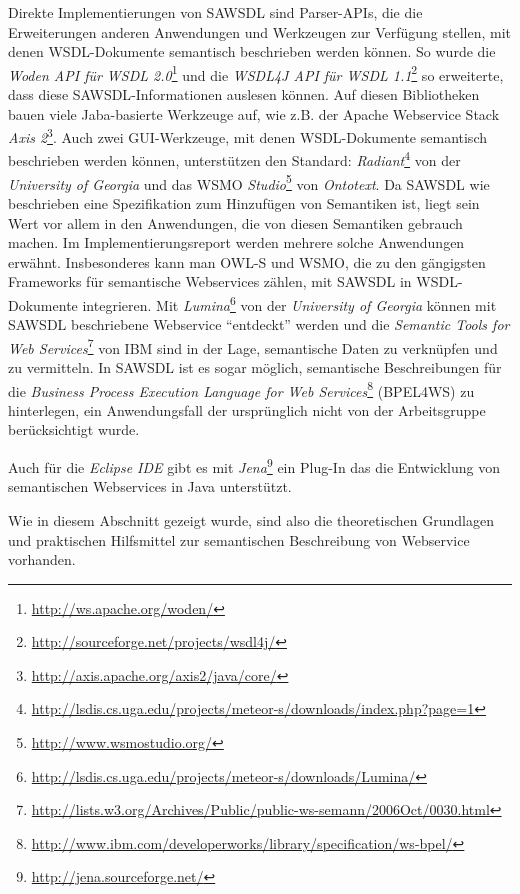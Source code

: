 Direkte Implementierungen von \ac{SAWSDL} sind Parser-\ac{API}s, die die Erweiterungen anderen Anwendungen und Werkzeugen zur Verfügung stellen, mit denen \ac{WSDL}-Dokumente semantisch beschrieben werden können. So wurde die \emph{Woden API für WSDL 2.0}\footnote{\url{http://ws.apache.org/woden/}} und die \emph{WSDL4J API für WSDL
1.1}\footnote{\url{http://sourceforge.net/projects/wsdl4j/}} so erweiterte, dass diese \ac{SAWSDL}-Informationen auslesen können. Auf diesen Bibliotheken bauen viele Jaba-basierte Werkzeuge auf, wie z.B. der Apache Webservice Stack \emph{Axis 2}\footnote{\url{http://axis.apache.org/axis2/java/core/}}. Auch zwei GUI-Werkzeuge, mit denen \ac{WSDL}-Dokumente semantisch beschrieben werden können, unterstützen den Standard: \emph{Radiant}\footnote{\url{http://lsdis.cs.uga.edu/projects/meteor-s/downloads/index.php?page=1}} von der \emph{University of Georgia} und das \acl{WSMO} \emph{Studio}\footnote{\url{http://www.wsmostudio.org/}} von \emph{Ontotext}. Da \ac{SAWSDL} wie beschrieben eine Spezifikation zum Hinzufügen von Semantiken ist, liegt sein Wert vor allem in den Anwendungen, die von diesen Semantiken gebrauch machen. Im Implementierungsreport werden mehrere solche Anwendungen erwähnt.
Insbesonderes kann man \ac{OWL-S} und \ac{WSMO}, die zu den gängigsten Frameworks für semantische Webservices zählen,  mit \ac{SAWSDL} in \ac{WSDL}-Dokumente integrieren. Mit \emph{Lumina}\footnote{\url{http://lsdis.cs.uga.edu/projects/meteor-s/downloads/Lumina/}} von der \emph{University of Georgia} können mit \ac{SAWSDL} beschriebene Webservice "`entdeckt"' werden und die \emph{Semantic Tools for Web Services}\footnote{\url{http://lists.w3.org/Archives/Public/public-ws-semann/2006Oct/0030.html}} von IBM sind in der Lage, semantische Daten zu verknüpfen und zu vermitteln.
In \ac{SAWSDL} ist es sogar möglich, semantische Beschreibungen für die \emph{Business Process Execution Language for Web Services}\footnote{\url{http://www.ibm.com/developerworks/library/specification/ws-bpel/}} (BPEL4WS) zu hinterlegen, ein Anwendungsfall der ursprünglich nicht von der Arbeitsgruppe berücksichtigt wurde. \cite[S.63]{ky-sawsdl}

Auch für die \emph{Eclipse IDE} gibt es mit \emph{Jena}\footnote{\url{http://jena.sourceforge.net/}} ein Plug-In das die Entwicklung von semantischen Webservices in Java unterstützt.

\bigskip

Wie in diesem Abschnitt gezeigt wurde, sind also die theoretischen Grundlagen und praktischen Hilfsmittel zur semantischen Beschreibung von Webservice vorhanden.
